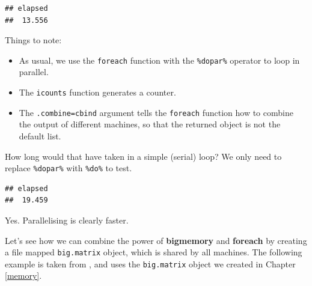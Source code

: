 \documentclass[]{book}
\newenvironment{Shaded}{\begin{snugshade}}{\end{snugshade}}
\newcommand{\DataTypeTok}[1]{\textcolor[rgb]{0.13,0.29,0.53}{#1}}
\newcommand{\DecValTok}[1]{\textcolor[rgb]{0.00,0.00,0.81}{#1}}
\newcommand{\KeywordTok}[1]{\textcolor[rgb]{0.13,0.29,0.53}{\textbf{#1}}}
\newcommand{\NormalTok}[1]{#1}
\newcommand{\OperatorTok}[1]{\textcolor[rgb]{0.81,0.36,0.00}{\textbf{#1}}}
\newcommand{\OtherTok}[1]{\textcolor[rgb]{0.56,0.35,0.01}{#1}}
\newcommand{\StringTok}[1]{\textcolor[rgb]{0.31,0.60,0.02}{#1}}
\providecommand{\tightlist}{%
  \setlength{\itemsep}{0pt}\setlength{\parskip}{0pt}}
\theoremstyle{definition}
\theoremstyle{definition}
\theoremstyle{definition}
\theoremstyle{remark}
\begin{document}
\begin{verbatim}
## elapsed 
##  13.556
\end{verbatim}

Things to note:

\begin{itemize}
\tightlist
\item
  As usual, we use the \texttt{foreach} function with the \texttt{\%dopar\%} operator to loop in parallel.
\item
  The \texttt{icounts} function generates a counter.
\item
  The \texttt{.combine=cbind} argument tells the \texttt{foreach} function how to combine the output of different machines, so that the returned object is not the default list.
\end{itemize}

How long would that have taken in a simple (serial) loop?
We only need to replace \texttt{\%dopar\%} with \texttt{\%do\%} to test.

\begin{Shaded}
\end{Shaded}

\begin{verbatim}
## elapsed 
##  19.459
\end{verbatim}

Yes. Parallelising is clearly faster.

Let's see how we can combine the power of \textbf{bigmemory} and \textbf{foreach} by creating a file mapped \texttt{big.matrix} object, which is shared by all machines.
The following example is taken from \citet{kane2013scalable}, and uses the \texttt{big.matrix} object we created in Chapter \ref{memory}.
\end{document}
